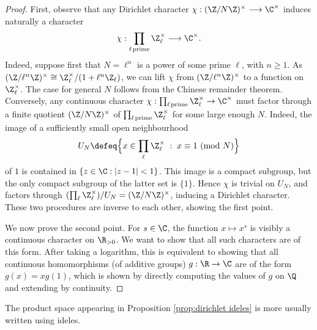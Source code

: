 \documentclass[a4paper,10pt, english, reqno]{smfart}
\numberwithin{equation}{section}
\begin{document}
\begin{proof}
First, observe that any Dirichlet character $\chi : (\Z/N\Z)^\times \longrightarrow \C^\times$  induces naturally a character
		\[\chi : \prod_{\ell\hspace{1pt}\mathrm{prime}} \Z_\ell^\times \longrightarrow \C^\times.\]
Indeed, suppose first that $N = \ell^n$ is a power of some prime $\ell$, with $n \geq 1$. As $(\Z/\ell^n\Z)^\times \cong \Z_\ell^\times/(1+\ell^n\Z_\ell)$, we can lift $\chi$ from $(\Z/\ell^n\Z)^\times$ to a function on $\Z_\ell^\times$. 
The case for general $N$ follows from the Chinese remainder theorem.  Conversely, any continuous character $\chi: \prod_{\ell\hspace{1pt}\mathrm{prime}} \Z_\ell^\times \to \C^\times$ must factor through a finite quotient $(\Z / N \Z)^\times$ of $\prod_{\ell\hspace{1pt}\mathrm{prime}} \Z_\ell^\times$ for some large enough $N$. Indeed, the image of a sufficiently small open neighbourhood 
\[
    U_N\defeq \Big\{ x \in \prod_{\ell} \Z_\ell^\times \; : \; x \equiv 1 \text{ (mod $N$)} \Big\}
\]
of $1$ is contained in $\{ z \in \C : |z - 1| < 1\}$. This image is a compact subgroup, but the only compact subgroup of the latter set is $\{1\}$. Hence $\chi$ is trivial on $U_N$, and factors through $(\prod_\ell \Z_\ell^\times) / U_N = (\Z / N \Z)^\times$, inducing a Dirichlet character. These two procedures are inverse to each other, showing the first point. 

	
We now prove the second point. For $s \in \C$, the function $x \mapsto x^s$ is visibly a continuous character on $\R_{>0}$. We want to show that all such characters are of this form. After taking a logarithm, this is equivalent to showing that all continuous homomorphisms (of additive groups) $g : \R \rightarrow \C$ are of the form $g(x) = xg(1)$, which is shown by directly computing the values of $g$ on $\Q$ and extending by continuity.
\end{proof}



The product space appearing in Proposition \ref{prop:dirichlet ideles} is more usually written using ideles.
\end{document}
